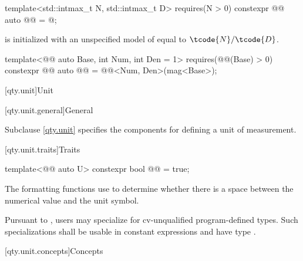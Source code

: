 \begin{codeblock}
template<std::intmax_t N, std::intmax_t D>
  requires(N > 0)
constexpr @@ auto @@ = @\seebelownc@;
\end{codeblock}

\pnum
{} is initialized with
an unspecified model of  equal to $\tcode{N}/\tcode{D}$.

\begin{codeblock}
template<@@ auto Base, int Num, int Den = 1>
  requires(@@(Base) > 0)
constexpr @@ auto @@ = @@<Num, Den>(mag<Base>);
\end{codeblock}

[qty.unit]{Unit}

[qty.unit.general]{General}

\pnum
Subclause \ref{qty.unit} specifies the components
for defining a unit of measurement.

[qty.unit.traits]{Traits}

\begin{itemdecl}
template<@@ auto U>
constexpr bool @@ = true;
\end{itemdecl}

\begin{itemdescr}
\pnum
The formatting functions use 
to determine whether there is a space
between the numerical value and the unit symbol.

\pnum
\remarks
Pursuant to ,
users may specialize 
for cv-unqualified program-defined types.
Such specializations shall be usable in constant expressions
and have type .
\end{itemdescr}

[qty.unit.concepts]{Concepts}

